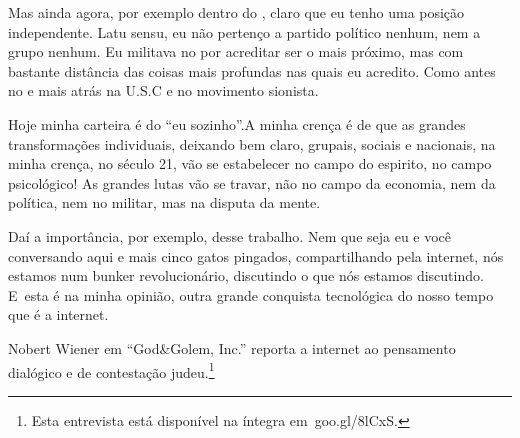  

Mas ainda agora, por exemplo dentro do , claro que eu tenho uma
posição independente. Latu sensu, eu não pertenço a partido político
nenhum, nem a grupo nenhum. Eu militava no  por acreditar ser o mais
próximo, mas com bastante distância das coisas mais profundas nas quais
eu acredito. Como antes no  e mais atrás na U.S.C e no movimento
sionista.

Hoje minha carteira é do ``eu sozinho''.A minha crença é de que as
grandes transformações individuais, deixando bem claro, grupais, sociais
e nacionais, na minha crença, no século 21, vão se estabelecer no campo
do espirito, no campo psicológico! As grandes lutas vão se travar, não
no campo da economia, nem da política, nem no militar, mas na disputa da
mente.

 

Daí a importância, por exemplo, desse trabalho. Nem que seja eu e você
conversando aqui e mais cinco gatos pingados, compartilhando pela
internet, nós estamos num bunker revolucionário, discutindo o que nós
estamos discutindo. E~esta é na minha opinião, outra grande conquista
tecnológica do nosso tempo que é a internet.

 

Nobert Wiener em ``God\&Golem, Inc.'' reporta a internet ao pensamento
dialógico e de contestação judeu.\footnote{Esta entrevista está disponível na íntegra em~goo.gl/8lCxS.} 

\fechafala
